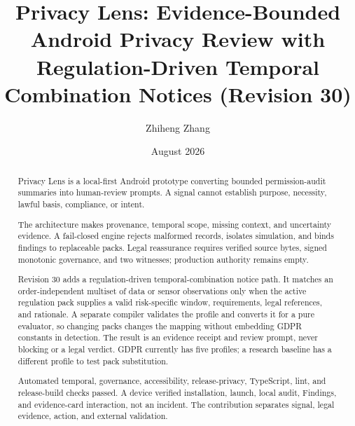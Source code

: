 \documentclass[11pt,a4paper]{article}
\title{Privacy Lens: Evidence-Bounded Android Privacy Review with Regulation-Driven Temporal Combination Notices (Revision 30)}
\author{Zhiheng Zhang}
\date{August 2026}
\begin{document}
\maketitle
\begin{abstract}
\small\singlespacing
Privacy Lens is a local-first Android prototype converting bounded permission-audit summaries into human-review prompts. A signal cannot establish purpose, necessity, lawful basis, compliance, or intent.

The architecture makes provenance, temporal scope, missing context, and uncertainty evidence. A fail-closed engine rejects malformed records, isolates simulation, and binds findings to replaceable packs. Legal reassurance requires verified source bytes, signed monotonic governance, and two witnesses; production authority remains empty.

Revision 30 adds a regulation-driven temporal-combination notice path. It matches an order-independent multiset of data or sensor observations only when the active regulation pack supplies a valid risk-specific window, requirements, legal references, and rationale. A separate compiler validates the profile and converts it for a pure evaluator, so changing packs changes the mapping without embedding GDPR constants in detection. The result is an evidence receipt and review prompt, never blocking or a legal verdict. GDPR currently has five profiles; a research baseline has a different profile to test pack substitution.

Automated temporal, governance, accessibility, release-privacy, TypeScript, lint, and release-build checks passed. A device verified installation, launch, local audit, Findings, and evidence-card interaction, not an incident. The contribution separates signal, legal evidence, action, and external validation.
\end{abstract}
\newpage
\tableofcontents
\newpage







{\small


}
\end{document}
